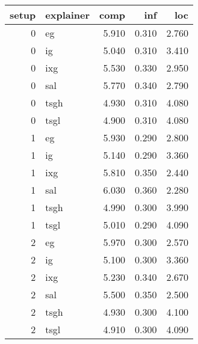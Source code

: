 \begin{tabular}{rlrrr}
\toprule
setup & explainer & comp & inf & loc \\
\midrule
0 & eg & 5.910 & 0.310 & 2.760 \\
0 & ig & 5.040 & 0.310 & 3.410 \\
0 & ixg & 5.530 & 0.330 & 2.950 \\
0 & sal & 5.770 & 0.340 & 2.790 \\
0 & tsgh & 4.930 & 0.310 & 4.080 \\
0 & tsgl & 4.900 & 0.310 & 4.080 \\
1 & eg & 5.930 & 0.290 & 2.800 \\
1 & ig & 5.140 & 0.290 & 3.360 \\
1 & ixg & 5.810 & 0.350 & 2.440 \\
1 & sal & 6.030 & 0.360 & 2.280 \\
1 & tsgh & 4.990 & 0.300 & 3.990 \\
1 & tsgl & 5.010 & 0.290 & 4.090 \\
2 & eg & 5.970 & 0.300 & 2.570 \\
2 & ig & 5.100 & 0.300 & 3.360 \\
2 & ixg & 5.230 & 0.340 & 2.670 \\
2 & sal & 5.500 & 0.350 & 2.500 \\
2 & tsgh & 4.930 & 0.300 & 4.100 \\
2 & tsgl & 4.910 & 0.300 & 4.090 \\
\bottomrule
\end{tabular}
